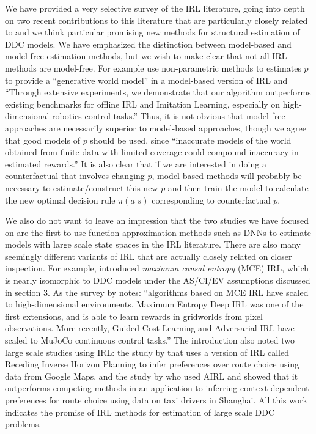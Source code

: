 We have provided a very selective survey of the 
IRL literature, going into depth on two recent contributions to this literature
that are particularly closely related to and we think particular promising new methods 
for structural estimation of DDC models.  We have emphasized the distinction between model-based and model-free
estimation methods, but we wish to make clear that not all IRL methods are model-free. 
For example \citet{zeng:2024} use non-parametric methods to estimates $p$ to provide a ``generative world model'' 
in a model-based version of IRL and ``Through extensive experiments, we demonstrate that our algorithm outperforms existing benchmarks for offline IRL and Imitation Learning, especially on high-dimensional robotics control tasks.'' 
Thus, it is not obvious that model-free approaches are necessarily superior to model-based approaches,
though we agree that good models of $p$ should be used, since  ``inaccurate models of the world obtained from finite data with limited coverage could compound inaccuracy in estimated rewards.''  It is also clear that if we are interested in 
doing a counterfactual that involves changing $p$, model-based methods will
probably be necessary to estimate/construct this new $p$ and
then train the model to calculate the new optimal decision rule $\pi(a|s)$ corresponding to counterfactual $p$.

We also do not want to leave an impression that the two studies we have focused on are the first to use
function approximation methods such as DNNs to estimate models with large scale state spaces
in the IRL literature. There are also many seemingly different variants of
IRL that are actually closely related on closer inspection. For example, \citet{ziebart:2010}
introduced {\it maximum causal entropy\/} (MCE) IRL, which is nearly isomorphic to DDC models
under the AS/CI/EV assumptions discussed in  section 3.  As the survey by \citet{gleave:2022} notes:
``algorithms based on MCE IRL have scaled to high-dimensional environments. Maximum Entropy Deep IRL \citet{maxentdeepirl:2016} was one of the first extensions, and is able to learn rewards in gridworlds from pixel observations. More recently, Guided Cost Learning 
\citet{guidedcostlearning:2016} and Adversarial IRL \citet{airl:2018} have scaled to MuJoCo continuous control tasks.''  
The introduction also noted two large scale studies using IRL: the study by
\citet{barnes:2024} that uses a version of IRL called Receding Inverse Horizon Planning to infer preferences  over
route choice using data from Google Maps,  and  the study by \citet{zhao:2023} who used AIRL and showed 
that it outperforms competing methods in an application to inferring context-dependent preferences for route choice 
using data on taxi drivers in Shanghai. All this work indicates the promise of IRL methods for estimation
of large scale DDC problems.
 

